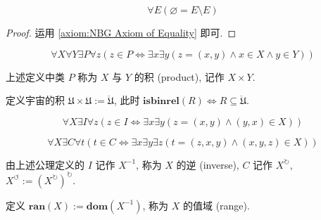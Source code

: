\begin{corollary}
    \[
        \forall E (\varnothing = E \setminus E)
    \]

    \begin{proof}
        运用 \ref{axiom:NBG Axiom of Equality} 即可.
    \end{proof}
\end{corollary}

\begin{axiom*}
    \label {axiom:NBG Axiom of Product}
    \[
        \forall X \forall Y \exists P \forall z (z \in P \Leftrightarrow \exists x \exists y (z = (x,y) \land x \in X \land y \in Y))
    \]
\end{axiom*}

\begin{definition}
    \label {definition:product of two classes}
    上述定义中类 \(P\) 称为 \(X\) 与 \(Y\) 的积 (product), 记作 \(X \times Y\).
\end{definition}

\begin{definition}
    定义宇宙的积 \(\mathfrak{U} \times \mathfrak{U} := \ddot {\mathfrak{U}}\),
    此时 \(\mathbf{isbinrel} (R) \Leftrightarrow R \subseteq \ddot {\mathfrak{U}}\).
\end{definition}

\begin{axiom*}
    \label {axiom:NBG Axiom of Inversion}
    \[
        \forall X \exists I \forall z (z \in I \Leftrightarrow \exists x \exists y (z = (x,y) \land (y,x) \in X))
    \]
\end{axiom*}

\begin{axiom*}
    \label {axiom:NBG Axiom of Cycle}
    \[
        \forall X \exists C \forall t (t \in C \Leftrightarrow \exists x \exists y \exists z (t = (z,x,y) \land (x,y,z) \in X))
    \]
\end{axiom*}

\begin{definition}
    由上述公理定义的 \(I\) 记作 \(X^{-1}\), 称为 \(X\) 的逆 (inverse), \(C\) 记作 \(X^{\circlearrowright}\), \(X^{\circlearrowleft} := {(X^{\circlearrowright})}^{\circlearrowright}\).
\end{definition}

\begin{definition}
    \label {definition:range}
    定义 \(\mathbf{ran} (X) := \mathbf{dom} (X^{-1})\), 称为 \(X\) 的值域 (range).
\end{definition}

